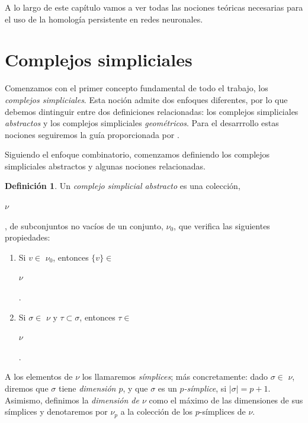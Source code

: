 \documentclass[12pt, a4paper, twoside]{book}
\numberwithin{equation}{section}
\theoremstyle{definition}
\newtheorem{defi}{Definición}[section]
\theoremstyle{remark}
\theoremstyle{plain}
\begin{document}
	A lo largo de este capítulo vamos a ver todas las nociones teóricas 
	necesarias para el uso de la homología persistente en redes neuronales.	
	
	\section{Complejos simpliciales}
	Comenzamos con el primer concepto fundamental de todo el trabajo, los 
	\emph{complejos simpliciales}. Esta noción admite dos enfoques 
	diferentes, por lo que debemos dintinguir entre dos definiciones 
	relacionadas: los complejos simpliciales \emph{abstractos} y los 
	complejos simpliciales \emph{geométricos}. Para el desarrrollo estas 
	nociones seguiremos la guía proporcionada por 
	\cite{TopoAlg-Edelsbrunner,Intro-Otter}.

	Siguiendo el enfoque combinatorio, comenzamos definiendo los complejos 
	simpliciales abstractos y algunas nociones relacionadas. 

	\begin{defi}
	
	Un \textit{complejo simplicial abstracto} es una colección, 
	\begin{Large}$\nu$\end{Large}, de subconjuntos no vacíos de un 
	conjunto, {\Large $\nu$}$_{0}$, que verifica las siguientes 
	propiedades:
	
	\begin{enumerate}
		\item Si $v \in $ {\Large $ \nu$}$_{0}$, entonces $\{v\} \in$
			\begin{Large}$ \nu$\end{Large}.
		\item Si $\sigma \in $ {\Large $ \nu$}$ \text{ y } \tau 
			\subset \sigma$, entonces $ \tau \in $
			\begin{Large}$ \nu$\end{Large}.
	\end{enumerate}
	
	A los elementos de {\Large $\nu$} los llamaremos \textit{símplices};
	más concretamente: dado $\sigma \in $ {\Large $\nu$}, diremos que 
	$\sigma$ tiene \textit{dimensión $p$}, y que $\sigma$ es un 
	\textit{$p$-símplice}, si $|\sigma|=p+1$. Asimismo, definimos la 
	\textit{dimensión de {\Large $\nu$}} como el máximo de las dimensiones 
	de sus símplices y denotaremos por {\Large $\nu$}$_{p}$ a la colección 
	de los $p$-símplices de {\Large $\nu$}.	
	
	\end{defi}
\end{document}
